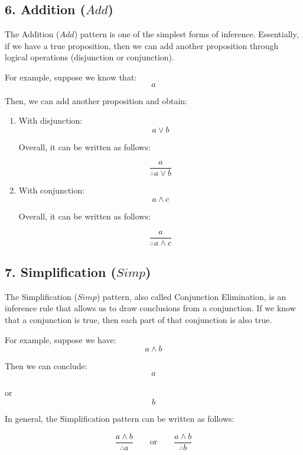 \subsection{\texorpdfstring{6. Addition
(\(Add\))}{6. Addition (Add)}}\label{addition-add}

The Addition (\(Add\)) pattern is one of the simplest forms of
inference. Essentially, if we have a true proposition, then we can add
another proposition through logical operations (disjunction or
conjunction).

For example, suppose we know that:\\
\[a\]

Then, we can add another proposition and obtain:

\begin{enumerate}
\def\labelenumi{\arabic{enumi}.}
\item
  With disjunction:\\
  \[a \lor b\]

  Overall, it can be written as follows:

  \[
   \frac{a}{\therefore a \lor b}
   \]
\item
  With conjunction:\\
  \[a \land c\]

  Overall, it can be written as follows:

  \[
   \frac{a}{\therefore a \land c}
   \]
\end{enumerate}

\subsection{\texorpdfstring{7. Simplification
(\(Simp\))}{7. Simplification (Simp)}}\label{simplification-simp}

The Simplification (\(Simp\)) pattern, also called Conjunction
Elimination, is an inference rule that allows us to draw conclusions
from a conjunction. If we know that a conjunction is true, then each
part of that conjunction is also true.

For example, suppose we have:\\
\[a \land b\]

Then we can conclude:\\
\[a\]\\
or\\
\[b\]

In general, the Simplification pattern can be written as follows:

\[
\frac{a \land b}{\therefore a}
\qquad \text{or} \qquad
\frac{a \land b}{\therefore b}
\]

